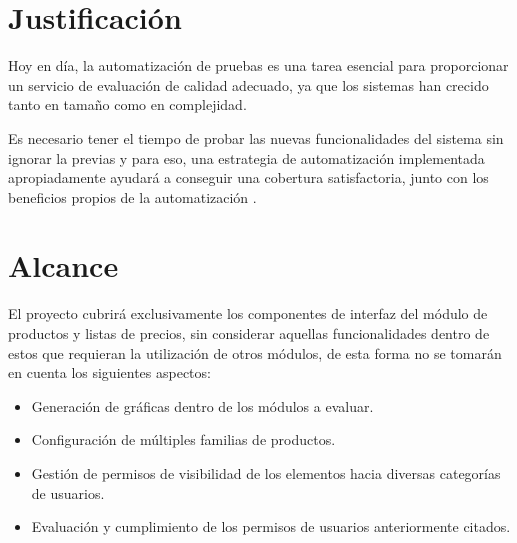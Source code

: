 \section{Justificación}
Hoy en día, la automatización de pruebas es una tarea esencial para proporcionar
un servicio de evaluación de calidad adecuado, ya que los sistemas han crecido
tanto en tamaño como en complejidad.

Es necesario tener el tiempo de probar las nuevas funcionalidades del sistema
sin ignorar la previas y para eso, una estrategia de automatización implementada
apropiadamente ayudará a conseguir una cobertura satisfactoria, junto con los
beneficios propios de la automatización \cite{Software}.

\section{Alcance}
El proyecto cubrirá exclusivamente los componentes de interfaz del módulo de
productos y listas de precios, sin considerar aquellas funcionalidades dentro de
estos que requieran la utilización de otros módulos, de esta forma no se tomarán
en cuenta los siguientes aspectos:

\begin{itemize}
\item Generación de gráficas dentro de los módulos a evaluar.
\item Configuración de múltiples familias de productos.
\item Gestión de permisos de visibilidad de los elementos hacia diversas
    categorías de usuarios.
\item Evaluación y cumplimiento de los permisos de usuarios anteriormente
    citados.
\end{itemize}

